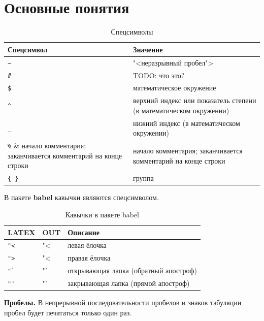 \section{Основные понятия}

\begin{table}[h]
    \caption{Спецсимволы}
    \label{specsymbols}
    \begin{tabular}{|l|p{}|}
        \hline
        \textbf{Спецсимвол} &
        \textbf{Значение} \\ \hline

        \verb|~| & "<неразрывный пробел"> \\ \hline
        \verb|#| & TODO: что это? \\ \hline
        \verb|$| & математическое окружение \\ \hline
        \verb|^| & верхний индекс или показатель степени (в математическом окружении) \\ \hline
        \verb|_| & нижний индекс (в математическом окружении) \\ \hline
        \verb|%| & начало комментария; заканчивается комментарий на конце строки \\ \hline
        \verb|{ }| & группа \\ \hline
    \end{tabular}
\end{table}

\bigskip

\noindent
В пакете \textbf{babel} кавычки являются спецсимволом.

\begin{table}[h]
    \caption{Кавычки в пакете babel}
    \label{quotes_in_babel}
    \begin{tabular}{|l|l|p{}|}
        \hline
        \textbf{LATEX} &
        \textbf{OUT}   &
        \textbf{Описание} \\ \hline
        \verb|"<| & "< & левая ёлочка  \\ \hline
        \verb|">| & "< & правая ёлочка \\ \hline
        \verb|"`| & "` & открывающая лапка (обратный апостроф) \\ \hline
        \verb|"'| & "' & закрывающая лапка (прямой апостроф)   \\ \hline
    \end{tabular}
\end{table}

\textbf{Пробелы.} В непрерывной последовательности пробелов и знаков табуляции пробел будет печататься только один раз.

